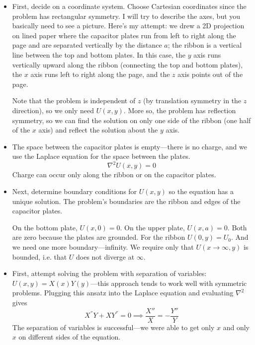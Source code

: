 \documentclass[11pt, a4paper]{article}
\renewcommand{\laplacian}{\nabla^{2}}
\begin{document}
\begin{itemize}
	\item First, decide on a coordinate system. Choose Cartesian coordinates since the problem has rectangular symmetry. I will try to describe the axes, but you basically need to see a picture. Here's my attempt: we drew a 2D projection on lined paper where the capacitor plates run from left to right along the page and are separated vertically by the distance $ a $; the ribbon is a vertical line between the top and bottom plates. In this case, the $ y $ axis runs vertically upward along the ribbon (connecting the top and bottom plates), the $ x $ axis runs left to right along the page, and the $ z $ axis points out of the page. 
	
	Note that the problem is independent of $ z $ (by translation symmetry in the $ z $ direction), so we only need $ U(x, y) $. More so, the problem has reflection symmetry, so we can find the solution on only one side of the ribbon (one half of the $ x $ axis) and reflect the solution about the $ y $ axis.
	
	\item The space between the capacitor plates is empty---there is no charge, and we use the Laplace equation for the space between the plates.
	\begin{equation*}
		\laplacian U(x, y) = 0
	\end{equation*}
	Charge can occur only along the ribbon or on the capacitor plates.
	
	\item Next, determine boundary conditions for $ U(x, y) $ so the equation has a unique solution. The problem's boundaries are the ribbon and edges of the capacitor plates.
	
	On the bottom plate, $ U(x, 0) = 0 $. On the upper plate, $ U(x, a) = 0 $. Both are zero because the plates are grounded. For the ribbon $ U(0, y) = U_{0} $. And we need one more boundary---infinity. We require only that $ U(x \to \infty, y) $ is bounded, i.e. that $ U $ does not diverge at $ \infty $. 
	
	\item First, attempt solving the problem with separation of variables: $ U(x, y) = X(x)Y(y) $---this approach tends to work well with symmetric problems. Plugging this ansatz into the Laplace equation and evaluating $ \laplacian $ gives
	\begin{equation*}
		X^{''}Y + XY^{''} = 0 \implies \frac{X''}{X} = - \frac{Y''}{Y}
	\end{equation*}
	The separation of variables is successful---we were able to get only $ x $ and only $ x $ on different sides of the equation. 
	

\end{itemize}
\end{document}
